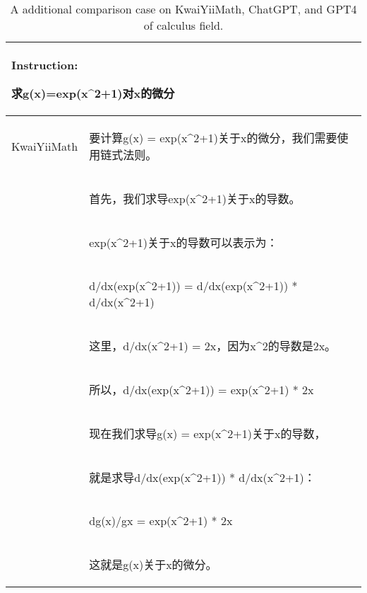 \documentclass{article}
\begin{document}
\begin{table}[h!]
\caption{A additional comparison case on KwaiYiiMath, ChatGPT, and GPT4 of calculus field.}
\begin{tabular}{ c|l } 
 \hline
 \multicolumn{2}{l}{\textbf{Instruction:} \begin{CJK*}{UTF8}{gbsn} 求g(x)=exp(x\^{}2+1)对x的微分 \end{CJK*}} \\
 \hline
 KwaiYiiMath & \begin{CJK*}{UTF8}{gbsn} 要计算g(x) = exp(x\^{}2+1)关于x的微分，我们需要使用链式法则。\end{CJK*}\\
             & \begin{CJK*}{UTF8}{gbsn} 首先，我们求导exp(x\^{}2+1)关于x的导数。\end{CJK*}\\
             & \begin{CJK*}{UTF8}{gbsn} exp(x\^{}2+1)关于x的导数可以表示为： \end{CJK*}\\
             & \begin{CJK*}{UTF8}{gbsn} d/dx(exp(x\^{}2+1)) = d/dx(exp(x\^{}2+1)) * d/dx(x\^{}2+1) \end{CJK*}\\
             & \begin{CJK*}{UTF8}{gbsn} 这里，d/dx(x\^{}2+1) = 2x，因为x\^{}2的导数是2x。 \end{CJK*}\\
             & \begin{CJK*}{UTF8}{gbsn} 所以，d/dx(exp(x\^{}2+1)) = exp(x\^{}2+1) * 2x \end{CJK*}\\
             & \begin{CJK*}{UTF8}{gbsn} 现在我们求导g(x) = exp(x\^{}2+1)关于x的导数， \end{CJK*}\\
             & \begin{CJK*}{UTF8}{gbsn} 就是求导d/dx(exp(x\^{}2+1)) * d/dx(x\^{}2+1)： \end{CJK*}\\
             & \begin{CJK*}{UTF8}{gbsn} dg(x)/gx = exp(x\^{}2+1) * 2x \end{CJK*}\\
              & \begin{CJK*}{UTF8}{gbsn} 这就是g(x)关于x的微分。 \end{CJK*}\\
             

\end{tabular}
\end{table}
\end{document}
